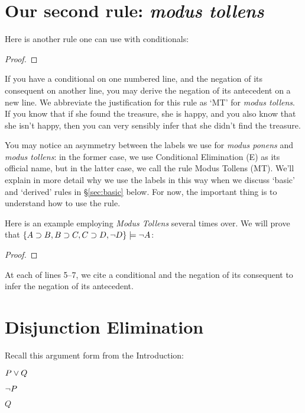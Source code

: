 \section{Our second rule: \emph{modus tollens}}

Here is another rule one can use with conditionals:

\begin{proof}
	 
\end{proof}

If you have a conditional on one numbered line, and the negation of its consequent on another line, you may derive the negation of its antecedent on a new line. We abbreviate the justification for this rule as `MT' for \emph{modus tollens}. If you know that if she found the treasure, she is happy, and you also know that she isn't happy, then you can very sensibly infer that she didn't find the treasure.

You may notice an asymmetry between the labels we use for \emph{modus ponens} and \emph{modus tollens}: in the former case, we use Conditional Elimination (\eif E) as its official name, but in the latter case, we call the rule Modus Tollens (MT). We'll explain in more detail why we use the labels in this way when we discuss `basic' and `derived' rules in \S\ref{sec:basic} below. For now, the important thing is to understand how to use the rule.

Here is an example employing \emph{Modus Tollens} several times over. We will prove that $\{A \supset B, B \supset C, C \supset D, \neg D\} \models \neg A$:

\begin{proof}
	 
	 
	 
	 
\end{proof}

At each of lines 5--7, we cite a conditional and the negation of its consequent to infer the negation of its antecedent.

\section{Disjunction Elimination}

Recall this argument form from the Introduction:

\begin{earg}
\item[] $P \vee Q$
\item[] $\neg P$
\item[\therefore] $Q$
\end{earg}

